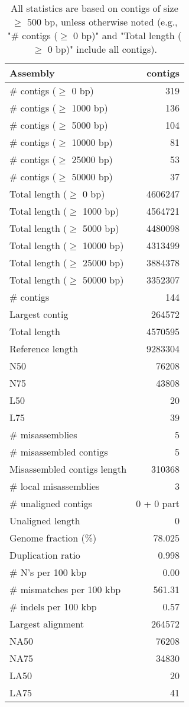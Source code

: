 \documentclass[12pt,a4paper]{article}
\begin{document}
\begin{table}[ht]
\begin{center}
\caption{All statistics are based on contigs of size $\geq$ 500 bp, unless otherwise noted (e.g., "\# contigs ($\geq$ 0 bp)" and "Total length ($\geq$ 0 bp)" include all contigs).}
\begin{tabular}{|l*{1}{|r}|}
\hline
Assembly & contigs \\ \hline
\# contigs ($\geq$ 0 bp) & 319 \\ \hline
\# contigs ($\geq$ 1000 bp) & 136 \\ \hline
\# contigs ($\geq$ 5000 bp) & 104 \\ \hline
\# contigs ($\geq$ 10000 bp) & 81 \\ \hline
\# contigs ($\geq$ 25000 bp) & 53 \\ \hline
\# contigs ($\geq$ 50000 bp) & 37 \\ \hline
Total length ($\geq$ 0 bp) & 4606247 \\ \hline
Total length ($\geq$ 1000 bp) & 4564721 \\ \hline
Total length ($\geq$ 5000 bp) & 4480098 \\ \hline
Total length ($\geq$ 10000 bp) & 4313499 \\ \hline
Total length ($\geq$ 25000 bp) & 3884378 \\ \hline
Total length ($\geq$ 50000 bp) & 3352307 \\ \hline
\# contigs & 144 \\ \hline
Largest contig & 264572 \\ \hline
Total length & 4570595 \\ \hline
Reference length & 9283304 \\ \hline
N50 & 76208 \\ \hline
N75 & 43808 \\ \hline
L50 & 20 \\ \hline
L75 & 39 \\ \hline
\# misassemblies & 5 \\ \hline
\# misassembled contigs & 5 \\ \hline
Misassembled contigs length & 310368 \\ \hline
\# local misassemblies & 3 \\ \hline
\# unaligned contigs & 0 + 0 part \\ \hline
Unaligned length & 0 \\ \hline
Genome fraction (\%) & 78.025 \\ \hline
Duplication ratio & 0.998 \\ \hline
\# N's per 100 kbp & 0.00 \\ \hline
\# mismatches per 100 kbp & 561.31 \\ \hline
\# indels per 100 kbp & 0.57 \\ \hline
Largest alignment & 264572 \\ \hline
NA50 & 76208 \\ \hline
NA75 & 34830 \\ \hline
LA50 & 20 \\ \hline
LA75 & 41 \\ \hline
\end{tabular}
\end{center}
\end{table}
\end{document}

